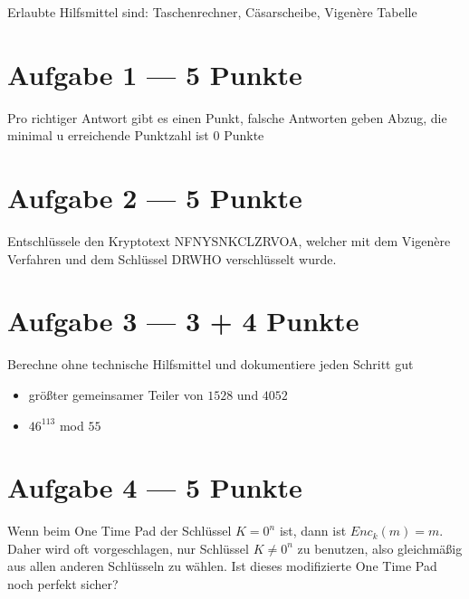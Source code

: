 \documentclass{../crypto_2}
\date{03. Februar 2016}
\begin{document}
\maketitle

Erlaubte Hilfsmittel sind: Taschenrechner, Cäsarscheibe, Vigenère Tabelle

\section*{Aufgabe 1 --- 5 Punkte}
Pro richtiger Antwort gibt es einen Punkt, falsche Antworten geben Abzug, die minimal u erreichende Punktzahl ist 0 Punkte
\medskip \\
\begin{alterqcm}[lq=13cm,language=german] 
\end{alterqcm}

\section*{Aufgabe 2 --- 5 Punkte}
Entschlüssele den Kryptotext NFNYSNKCLZRVOA, welcher mit dem Vigenère Verfahren und dem Schlüssel DRWHO verschlüsselt wurde.

\section*{Aufgabe 3 --- 3 + 4 Punkte}
Berechne ohne technische Hilfsmittel und dokumentiere jeden Schritt gut\begin{itemize}
\item größter gemeinsamer Teiler von $1528$ und $4052$
\item $46^{113}$ mod $55$
\end{itemize}
\section*{Aufgabe 4 --- 5 Punkte}
Wenn beim One Time Pad der Schlüssel $K=0^n$ ist, dann ist $Enc_k(m) = m$. Daher wird oft vorgeschlagen, nur Schlüssel $K\neq 0^n$ zu benutzen, also gleichmäßig aus allen anderen Schlüsseln zu wählen. Ist dieses modifizierte One Time Pad noch perfekt sicher? 
\end{document}

